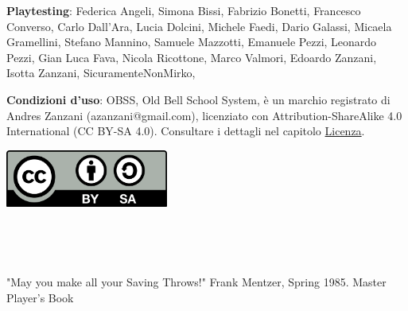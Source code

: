 \vfill

\begin{mdframed}[roundcorner=10pt]

\medskip

\thispagestyle{empty}

\textbf{Playtesting}: Federica Angeli, Simona Bissi, Fabrizio Bonetti, Francesco Converso, Carlo Dall'Ara, Lucia Dolcini, Michele Faedi, Dario Galassi, Micaela Gramellini, Stefano Mannino, Samuele Mazzotti, Emanuele Pezzi, Leonardo Pezzi, Gian Luca Fava, Nicola Ricottone, Marco Valmori, Edoardo Zanzani, Isotta Zanzani, SicuramenteNonMirko,

\bigskip

\begin{flushleft}\textbf{Condizioni d'uso}: OBSS, Old Bell School System, è un marchio registrato di Andres Zanzani (azanzani@gmail.com), licenziato con Attribution-ShareAlike 4.0 International (CC BY-SA 4.0). Consultare i dettagli nel capitolo \hyperlink{Licenza}{Licenza}.
\end{flushleft}

\vspace{0.5cm}

\begin{center}
\includegraphics[keepaspectratio,width=0.4\textwidth]{immagini/CC_BY-SA_icon.svg.png}
\end{center}

\medskip

\end{mdframed}


\pagebreak ~

\thispagestyle{empty}

\pagebreak ~

\setcounter{page}{1}


\setcounter{page}{1}

\begin{multicols}{2}

{\small \tableofcontents{}}

\end{multicols}

\vfill

\begin{changemargin}{0.3cm}{0.3cm}\begin{tcolorbox}
"May you make all your Saving Throws!" Frank Mentzer, Spring 1985. Master Player's Book
\end{tcolorbox}\end{changemargin}

